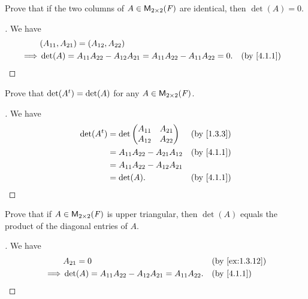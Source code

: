 \begin{ex}\label{ex:4.1.6}
	Prove that if the two columns of \(A \in \mathsf{M}_{{2} \times 2}({\mathit{F}})\) are identical, then \(\det(A) = 0\).
\end{ex}

\begin{proof}[]
	We have
	\begin{align*}
		         & (A_{1 1}, A_{2 1}) = (A_{1 2}, A_{2 2})                                                              \\
		\implies & \det(A) = A_{1 1} A_{2 2} - A_{1 2} A_{2 1} = A_{1 1} A_{2 2} - A_{1 1} A_{2 2} = 0. &  & \by{4.1.1}
	\end{align*}
\end{proof}

\begin{ex}\label{ex:4.1.7}
	Prove that \(\det({A}^{t}) = \det(A)\) for any \(A \in \mathsf{M}_{{2} \times 2}({\mathit{F}})\).
\end{ex}

\begin{proof}[]
	We have
	\begin{align*}
		\det(\tp{A}) & = \det\begin{pmatrix}
			                     A_{1 1} & A_{2 1} \\
			                     A_{1 2} & A_{2 2}
		                     \end{pmatrix}               &  & \by{1.3.3}   \\
		             & = A_{1 1} A_{2 2} - A_{2 1} A_{1 2} &  & \by{4.1.1} \\
		             & = A_{1 1} A_{2 2} - A_{1 2} A_{2 1}                 \\
		             & = \det(A).                          &  & \by{4.1.1}
	\end{align*}
\end{proof}

\begin{ex}\label{ex:4.1.8}
	Prove that if \(A \in \mathsf{M}_{{2} \times 2}({\mathit{F}})\) is upper triangular, then \(\det(A)\) equals the product of the diagonal entries of \(A\).
\end{ex}

\begin{proof}[]
	We have
	\begin{align*}
		         & A_{2 1} = 0                                                    &  & \by{ex:1.3.12} \\
		\implies & \det(A) = A_{1 1} A_{2 2} - A_{1 2} A_{2 1} = A_{1 1} A_{2 2}. &  & \by{4.1.1}
	\end{align*}
\end{proof}

